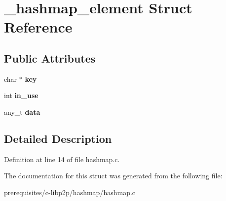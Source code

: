 \hypertarget{struct__hashmap__element}{}\section{\+\_\+hashmap\+\_\+element Struct Reference}
\label{struct__hashmap__element}
\subsection*{Public Attributes}
\begin{DoxyCompactItemize}
\item 
\mbox{\label{struct__hashmap__element_a3beb8f98920c367c7dddd2d2c8774d7f}} 
char $\ast$ {\bfseries key}
\item 
\mbox{\label{struct__hashmap__element_abe911f8f14c46112d0bc7f3d4cb51640}} 
int {\bfseries in\+\_\+use}
\item 
\mbox{\label{struct__hashmap__element_a26bd6b1359a52c819d6d83503aab04c3}} 
any\+\_\+t {\bfseries data}
\end{DoxyCompactItemize}


\subsection{Detailed Description}


Definition at line 14 of file hashmap.\+c.



The documentation for this struct was generated from the following file\+:\begin{DoxyCompactItemize}
\item 
prerequisites/c-\/libp2p/hashmap/hashmap.\+c\end{DoxyCompactItemize}
